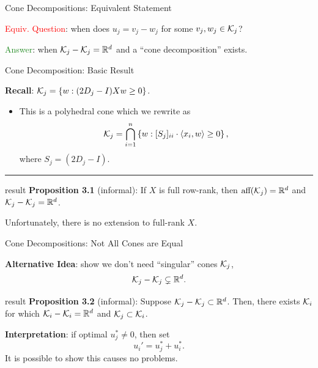 \documentclass[usenames,dvipsnames,mathserif,notheorems]{beamer}
\newcommand{\horizontalrule}{
	{
			\vspace{-0.5em}
			\center \rule{\textwidth}{0.1em}
			\vspace{-0.2em}
		}
}
\newcommand{\red}[1]{\textcolor{Red}{#1}}
\newcommand{\green}[1]{\textcolor{ForestGreen}{#1}}
\begin{document}
\begin{frame}{Cone Decompositions: Equivalent Statement}

	\red{Equiv. Question}: when does \( u_j = v_j - w_j \) for some \( v_j, w_j \in \mathcal{K}_j \)?

	\pause
	\vspace{1em}

	\green{Answer}: when \( \mathcal{K}_j - \mathcal{K}_j = \mathbb{R}^d \) and a ``cone decomposition'' exists.
	\pause

	\begin{figure}[]
		\centering
		
	\end{figure}

\end{frame}
\begin{frame}{Cone Decomposition: Basic Result}

	\textbf{Recall}: \( \mathcal{K}_j = \left\{w : (2 D_j - I) X w \geq 0\right\} \).
	\pause

	\begin{itemize}
		\item This is a polyhedral cone which we rewrite as
		      \[
			      \mathcal{K}_j = \bigcap_{i=1}^n \left\{w : [S_j]_{ii} \cdot \left\langle x_i, w\right\rangle \geq 0\right\},
		      \]
		      where \( S_j = (2D_j - I) \).
	\end{itemize}

	\pause
	\horizontalrule

	\begin{beamercolorbox}[wd=\textwidth,sep=1em]{result}
		\textbf{Proposition 3.1} (informal): If \( X \) is full row-rank,
		then \( \text{aff}(\mathcal{K}_j) = \mathbb{R}^d \) and
		\( \mathcal{K}_j - \mathcal{K}_j = \mathbb{R}^d \).
	\end{beamercolorbox}

	\vspace{1em}

	\pause
	Unfortunately, there is no extension to full-rank \( X \).

\end{frame}

\begin{frame}{Cone Decompositions: Not All Cones are Equal}

	\textbf{Alternative Idea}: show we don't need ``singular'' cones \( \mathcal{K}_j \),
	\[
		\mathcal{K}_j - \mathcal{K}_j \subsetneq \mathbb{R}^d.
	\]

	\vspace{1em}
	\pause

	\begin{beamercolorbox}[wd=\textwidth,sep=1em]{result}
		\textbf{Proposition 3.2} (informal): Suppose \( \mathcal{K}_j - \mathcal{K}_j \subset \mathbb{R}^d \).
		Then, there exists \( \mathcal{K}_i \) for which \( \mathcal{K}_i - \mathcal{K}_i = \mathbb{R}^d \)
		and \( \mathcal{K}_j \subset \mathcal{K}_i \).
	\end{beamercolorbox}

	\pause
	\vspace{1em}

	\textbf{Interpretation}: if optimal \( u^*_j \neq 0 \), then set
	\[
		u_i' = u_j^* + u_i^*.
	\]
	It is possible to show this causes no problems.


\end{frame}
\end{document}

